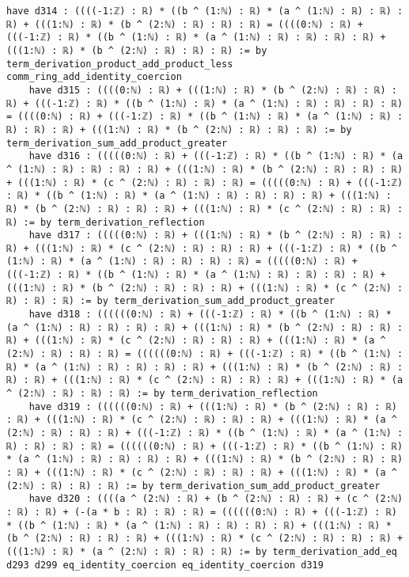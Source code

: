\documentclass{article}
\begin{document}
\begin{tcolorbox}[colback=white!10, width=\linewidth]
\begin{lstlisting}[language=Lean4]
    have d314 : ((((-1:ℤ) : ℝ) * ((b ^ (1:ℕ) : ℝ) * (a ^ (1:ℕ) : ℝ) : ℝ) : ℝ) + (((1:ℕ) : ℝ) * (b ^ (2:ℕ) : ℝ) : ℝ) : ℝ) = ((((0:ℕ) : ℝ) + (((-1:ℤ) : ℝ) * ((b ^ (1:ℕ) : ℝ) * (a ^ (1:ℕ) : ℝ) : ℝ) : ℝ) : ℝ) + (((1:ℕ) : ℝ) * (b ^ (2:ℕ) : ℝ) : ℝ) : ℝ) := by term_derivation_product_add_product_less comm_ring_add_identity_coercion
    have d315 : ((((0:ℕ) : ℝ) + (((1:ℕ) : ℝ) * (b ^ (2:ℕ) : ℝ) : ℝ) : ℝ) + (((-1:ℤ) : ℝ) * ((b ^ (1:ℕ) : ℝ) * (a ^ (1:ℕ) : ℝ) : ℝ) : ℝ) : ℝ) = ((((0:ℕ) : ℝ) + (((-1:ℤ) : ℝ) * ((b ^ (1:ℕ) : ℝ) * (a ^ (1:ℕ) : ℝ) : ℝ) : ℝ) : ℝ) + (((1:ℕ) : ℝ) * (b ^ (2:ℕ) : ℝ) : ℝ) : ℝ) := by term_derivation_sum_add_product_greater
    have d316 : (((((0:ℕ) : ℝ) + (((-1:ℤ) : ℝ) * ((b ^ (1:ℕ) : ℝ) * (a ^ (1:ℕ) : ℝ) : ℝ) : ℝ) : ℝ) + (((1:ℕ) : ℝ) * (b ^ (2:ℕ) : ℝ) : ℝ) : ℝ) + (((1:ℕ) : ℝ) * (c ^ (2:ℕ) : ℝ) : ℝ) : ℝ) = (((((0:ℕ) : ℝ) + (((-1:ℤ) : ℝ) * ((b ^ (1:ℕ) : ℝ) * (a ^ (1:ℕ) : ℝ) : ℝ) : ℝ) : ℝ) + (((1:ℕ) : ℝ) * (b ^ (2:ℕ) : ℝ) : ℝ) : ℝ) + (((1:ℕ) : ℝ) * (c ^ (2:ℕ) : ℝ) : ℝ) : ℝ) := by term_derivation_reflection
    have d317 : (((((0:ℕ) : ℝ) + (((1:ℕ) : ℝ) * (b ^ (2:ℕ) : ℝ) : ℝ) : ℝ) + (((1:ℕ) : ℝ) * (c ^ (2:ℕ) : ℝ) : ℝ) : ℝ) + (((-1:ℤ) : ℝ) * ((b ^ (1:ℕ) : ℝ) * (a ^ (1:ℕ) : ℝ) : ℝ) : ℝ) : ℝ) = (((((0:ℕ) : ℝ) + (((-1:ℤ) : ℝ) * ((b ^ (1:ℕ) : ℝ) * (a ^ (1:ℕ) : ℝ) : ℝ) : ℝ) : ℝ) + (((1:ℕ) : ℝ) * (b ^ (2:ℕ) : ℝ) : ℝ) : ℝ) + (((1:ℕ) : ℝ) * (c ^ (2:ℕ) : ℝ) : ℝ) : ℝ) := by term_derivation_sum_add_product_greater
    have d318 : ((((((0:ℕ) : ℝ) + (((-1:ℤ) : ℝ) * ((b ^ (1:ℕ) : ℝ) * (a ^ (1:ℕ) : ℝ) : ℝ) : ℝ) : ℝ) + (((1:ℕ) : ℝ) * (b ^ (2:ℕ) : ℝ) : ℝ) : ℝ) + (((1:ℕ) : ℝ) * (c ^ (2:ℕ) : ℝ) : ℝ) : ℝ) + (((1:ℕ) : ℝ) * (a ^ (2:ℕ) : ℝ) : ℝ) : ℝ) = ((((((0:ℕ) : ℝ) + (((-1:ℤ) : ℝ) * ((b ^ (1:ℕ) : ℝ) * (a ^ (1:ℕ) : ℝ) : ℝ) : ℝ) : ℝ) + (((1:ℕ) : ℝ) * (b ^ (2:ℕ) : ℝ) : ℝ) : ℝ) + (((1:ℕ) : ℝ) * (c ^ (2:ℕ) : ℝ) : ℝ) : ℝ) + (((1:ℕ) : ℝ) * (a ^ (2:ℕ) : ℝ) : ℝ) : ℝ) := by term_derivation_reflection
    have d319 : ((((((0:ℕ) : ℝ) + (((1:ℕ) : ℝ) * (b ^ (2:ℕ) : ℝ) : ℝ) : ℝ) + (((1:ℕ) : ℝ) * (c ^ (2:ℕ) : ℝ) : ℝ) : ℝ) + (((1:ℕ) : ℝ) * (a ^ (2:ℕ) : ℝ) : ℝ) : ℝ) + (((-1:ℤ) : ℝ) * ((b ^ (1:ℕ) : ℝ) * (a ^ (1:ℕ) : ℝ) : ℝ) : ℝ) : ℝ) = ((((((0:ℕ) : ℝ) + (((-1:ℤ) : ℝ) * ((b ^ (1:ℕ) : ℝ) * (a ^ (1:ℕ) : ℝ) : ℝ) : ℝ) : ℝ) + (((1:ℕ) : ℝ) * (b ^ (2:ℕ) : ℝ) : ℝ) : ℝ) + (((1:ℕ) : ℝ) * (c ^ (2:ℕ) : ℝ) : ℝ) : ℝ) + (((1:ℕ) : ℝ) * (a ^ (2:ℕ) : ℝ) : ℝ) : ℝ) := by term_derivation_sum_add_product_greater
    have d320 : ((((a ^ (2:ℕ) : ℝ) + (b ^ (2:ℕ) : ℝ) : ℝ) + (c ^ (2:ℕ) : ℝ) : ℝ) + (-(a * b : ℝ) : ℝ) : ℝ) = ((((((0:ℕ) : ℝ) + (((-1:ℤ) : ℝ) * ((b ^ (1:ℕ) : ℝ) * (a ^ (1:ℕ) : ℝ) : ℝ) : ℝ) : ℝ) + (((1:ℕ) : ℝ) * (b ^ (2:ℕ) : ℝ) : ℝ) : ℝ) + (((1:ℕ) : ℝ) * (c ^ (2:ℕ) : ℝ) : ℝ) : ℝ) + (((1:ℕ) : ℝ) * (a ^ (2:ℕ) : ℝ) : ℝ) : ℝ) := by term_derivation_add_eq d293 d299 eq_identity_coercion eq_identity_coercion d319

\end{lstlisting}
\end{tcolorbox}
\end{document}
